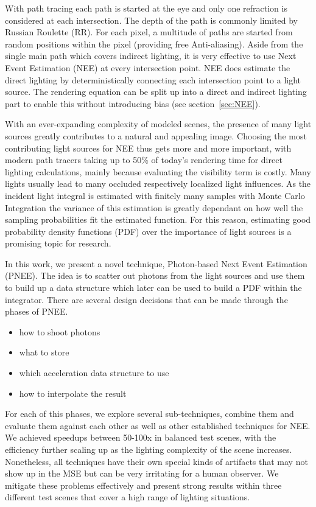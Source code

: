 With path tracing each path is started at the eye and only one refraction is considered at each intersection. The depth of the path is commonly limited by Russian Roulette (RR). For each pixel, a multitude of paths are started from random positions within the pixel (providing free Anti-aliasing). Aside from the single main path which covers indirect lighting, it is very effective to use Next Event Estimation (NEE) at every intersection point. NEE does estimate the direct lighting by deterministically connecting each intersection point to a light source. The rendering equation can be split up into a direct and indirect lighting part to enable this without introducing bias (see section~\ref{sec:NEE}).

With an ever-expanding complexity of modeled scenes, the presence of many light sources greatly contributes to a natural and appealing image. Choosing the most contributing light sources for NEE thus gets more and more important, with modern path tracers taking up to 50\% of today's rendering time for direct lighting calculations, mainly because evaluating the visibility term is costly. Many lights usually lead to many occluded respectively localized light influences. As the incident light integral is estimated with finitely many samples with Monte Carlo Integration the variance of this estimation is greatly dependant on how well the sampling probabilities fit the estimated function. For this reason, estimating good probability density functions (PDF) over the importance of light sources is a promising topic for research.

In this work, we present a novel technique, Photon-based Next Event Estimation (PNEE). The idea is to scatter out photons from the light sources and use them to build up a data structure which later can be used to build a PDF within the integrator. There are several design decisions that can be made through the phases of PNEE.

\begin{itemize}
    \item how to shoot photons
    \item what to store
    \item which acceleration data structure to use
    \item how to interpolate the result
\end{itemize}

For each of this phases, we explore several sub-techniques, combine them and evaluate them against each other as well as other established techniques for NEE. We achieved speedups between 50-100x in balanced test scenes, with the efficiency further scaling up as the lighting complexity of the scene increases. Nonetheless, all techniques have their own special kinds of artifacts that may not show up in the MSE but can be very irritating for a human observer. We mitigate these problems effectively and present strong results within three different test scenes that cover a high range of lighting situations.

